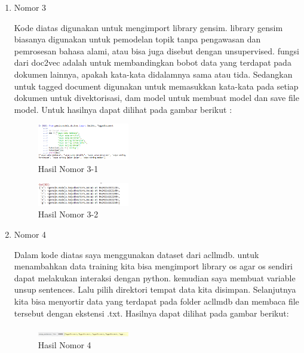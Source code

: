 \begin{enumerate}
\item Nomor 3
\hfill\break
	
Kode diatas digunakan untuk mengimport library gensim. library gensim biasanya digunakan untuk pemodelan topik tanpa pengawasan dan pemrosesan bahasa alami, atau bisa juga disebut dengan unsupervised. fungsi dari doc2vec adalah untuk membandingkan bobot data yang terdapat pada dokumen lainnya, apakah kata-kata didalamnya sama atau tida. Sedangkan untuk tagged document digunakan untuk memasukkan kata-kata pada setiap dokumen untuk divektorisasi, dam model untuk membuat model dan save file model. Untuk hasilnya dapat dilihat pada gambar berikut :
\hfill\break
	\begin{figure}[H]
		\includegraphics[width=4cm]{figures/1174054/5/26.png}
		\centering
		\caption{Hasil Nomor 3-1}
	\end{figure}
	\begin{figure}[H]
		\includegraphics[width=4cm]{figures/1174054/5/27.png}
		\centering
		\caption{Hasil Nomor 3-2}
	\end{figure}
	
\item Nomor 4
\hfill\break
	
Dalam kode diatas saya menggunakan dataset dari acllmdb. untuk menambahkan data training kita bisa mengimport library os agar os sendiri dapat melakukan interaksi dengan python. kemudian saya membuat variable unsup sentences. Lalu pilih direktori tempat data kita disimpan. Selanjutnya kita bisa menyortir data yang terdapat pada folder acllmdb dan membaca file tersebut dengan ekstensi .txt. Hasilnya dapat dilihat pada gambar berikut:
\hfill\break
	\begin{figure}[H]
		\includegraphics[width=4cm]{figures/1174054/5/28.png}
		\centering
		\caption{Hasil Nomor 4}
	\end{figure}	


\end{enumerate}
